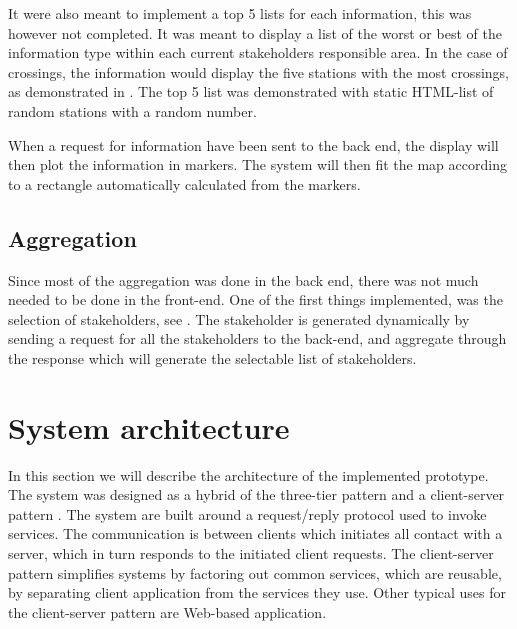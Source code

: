 It were also meant to implement a top 5 lists for each information, this was
however not completed. It was meant to display a list of the worst or best of
the information type within each current stakeholders responsible area. In the
case of crossings, the information would display the five stations with the 
most crossings, as demonstrated in . The top 5 list was 
demonstrated with static HTML-list of random stations with a random number.

When a request for information have been sent to the back end, the display will
then plot the information in markers. The system will then fit the map
according to a rectangle automatically calculated from the markers.

\subsection{Aggregation} %
\label{sub:front_end_aggregation}
Since most of the aggregation was done in the back end, there was not much
needed to be done in the front-end. One of the first things implemented, was 
the selection of stakeholders, see . The
stakeholder is generated dynamically by sending a request for all the 
stakeholders to the back-end, and aggregate through the response which will 
generate the selectable list of stakeholders. 


\section{System architecture} %
\label{sec:system_architecture}
In this section we will describe the architecture of the implemented prototype.
\\

The system was designed as a hybrid of the three-tier pattern \cite[pp. 235-237]{Bass:2012:SAP:2392670}
and a client-server pattern \cite[pp. 217-219]{Bass:2012:SAP:2392670}. The 
system are built around a request/reply protocol used to invoke services. The
communication is between clients which initiates all contact with 
a server, which in turn responds to the initiated client requests. The
client-server pattern simplifies systems by factoring out common services,
which are reusable, by separating client application from the services they
use. Other typical uses for the client-server pattern are Web-based
application.

